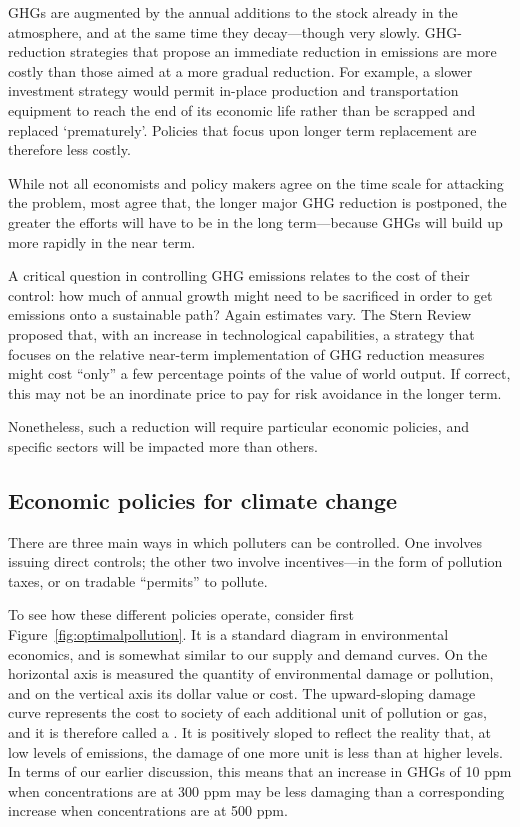 GHGs are augmented by the annual additions to the stock already in the atmosphere, and at the same time they decay---though very slowly. GHG-reduction strategies that propose an immediate reduction in emissions are more costly than those aimed at a more gradual reduction. For example, a slower investment strategy would permit in-place production and transportation equipment to reach the end of its economic life rather than be scrapped and replaced `prematurely'. Policies that focus upon longer term replacement are therefore less costly. 

While not all economists and policy makers agree on the time scale for attacking the problem, most agree that, the longer major GHG reduction is postponed, the greater the efforts will have to be in the long term---because GHGs will build up more rapidly in the near term. 

A critical question in controlling GHG emissions relates to the cost of their control: how much of annual growth might need to be sacrificed in order to get emissions onto a sustainable path? Again estimates vary. The Stern Review proposed that, with an increase in technological capabilities, a strategy that focuses on the relative near-term implementation of GHG reduction measures might cost ``only'' a few percentage points of the value of world output.  If correct, this may not be an inordinate price to pay for risk avoidance in the longer term.

Nonetheless, such a reduction will require particular economic policies, and specific sectors will be impacted more than others. 

\subsection*{Economic policies for climate change}

There are three main ways in which polluters can be controlled. One involves issuing direct controls; the other two involve incentives---in the form of pollution taxes, or on tradable ``permits'' to pollute.

To see how these different policies operate, consider first Figure~\ref{fig:optimalpollution}. It is a standard diagram in environmental economics, and is somewhat similar to our supply and demand curves. On the horizontal axis is measured the quantity of environmental damage or pollution, and on the vertical axis its dollar value or cost. The upward-sloping damage curve represents the cost to society of each additional unit of pollution or gas, and it is therefore called a . It is positively sloped to reflect the reality that, at low levels of emissions, the damage of one more unit is less than at higher levels. In terms of our earlier discussion, this means that an increase in GHGs of 10 ppm when concentrations are at 300 ppm may be less damaging than a corresponding increase when concentrations are at 500 ppm.

